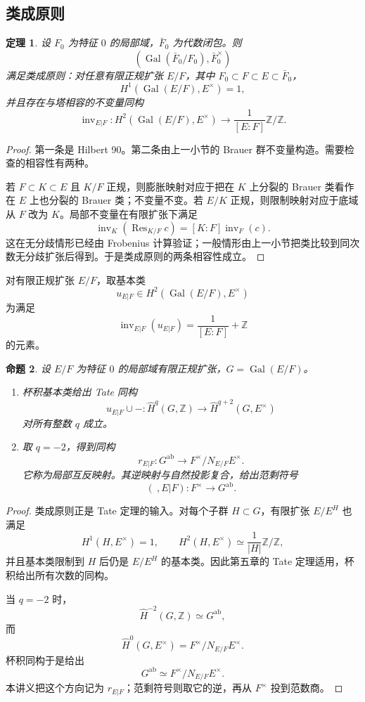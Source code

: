\documentclass[11pt,a4paper,openany]{ctexbook}
\numberwithin{equation}{chapter}
\newcommand{\Z}{\mathbb{Z}}
\newcommand{\Gal}{\operatorname{Gal}}
\theoremstyle{plain}
\newtheorem{theorem}{定理}[chapter]
\newtheorem{proposition}[theorem]{命题}
\theoremstyle{definition}
\theoremstyle{remark}
\begin{document}
\subsection{类成原则}

\begin{theorem}
设 $F_0$ 为特征 $0$ 的局部域，$\bar F_0$ 为代数闭包。则
\[
(\Gal(\bar F_0/F_0),\bar F_0^\times)
\]
满足类成原则：对任意有限正规扩张 $E/F$，其中 $F_0\subset F\subset E\subset\bar F_0$，
\[
H^1(\Gal(E/F),E^\times)=1,
\]
并且存在与塔相容的不变量同构
\[
\operatorname{inv}_{E|F}:H^2(\Gal(E/F),E^\times)\longrightarrow \frac1{[E:F]}\Z/\Z.
\]
\end{theorem}

\begin{proof}
第一条是 Hilbert 90。第二条由上一小节的 Brauer 群不变量构造。需要检查的相容性有两种。

若 $F\subset K\subset E$ 且 $K/F$ 正规，则膨胀映射对应于把在 $K$ 上分裂的 Brauer 类看作在 $E$ 上也分裂的 Brauer 类；不变量不变。若 $E/K$ 正规，则限制映射对应于底域从 $F$ 改为 $K$。局部不变量在有限扩张下满足
\[
\operatorname{inv}_K(\operatorname{Res}_{K/F}c)=[K:F]\operatorname{inv}_F(c).
\]
这在无分歧情形已经由 Frobenius 计算验证；一般情形由上一小节把类比较到同次数无分歧扩张后得到。于是类成原则的两条相容性成立。
\end{proof}

对有限正规扩张 $E/F$，取基本类
\[
u_{E|F}\in H^2(\Gal(E/F),E^\times)
\]
为满足
\[
\operatorname{inv}_{E|F}(u_{E|F})=\frac1{[E:F]}+\Z
\]
的元素。

\begin{proposition}
设 $E/F$ 为特征 $0$ 的局部域有限正规扩张，$G=\Gal(E/F)$。

\begin{enumerate}
\item 杯积基本类给出 Tate 同构
\[
u_{E|F}\cup -:\widehat H^q(G,\Z)\longrightarrow \widehat H^{q+2}(G,E^\times)
\]
对所有整数 $q$ 成立。
\item 取 $q=-2$，得到同构
\[
r_{E|F}:G^{\operatorname{ab}}\longrightarrow F^\times/N_{E/F}E^\times.
\]
它称为局部互反映射。其逆映射与自然投影复合，给出范剩符号
\[
(\ ,E|F):F^\times\longrightarrow G^{\operatorname{ab}}.
\]
\end{enumerate}
\end{proposition}

\begin{proof}
类成原则正是 Tate 定理的输入。对每个子群 $H\subset G$，有限扩张 $E/E^H$ 也满足
\[
H^1(H,E^\times)=1,\qquad H^2(H,E^\times)\simeq \frac1{|H|}\Z/\Z,
\]
并且基本类限制到 $H$ 后仍是 $E/E^H$ 的基本类。因此第五章的 Tate 定理适用，杯积给出所有次数的同构。

当 $q=-2$ 时，
\[
\widehat H^{-2}(G,\Z)\simeq G^{\operatorname{ab}},
\]
而
\[
\widehat H^0(G,E^\times)=F^\times/N_{E/F}E^\times.
\]
杯积同构于是给出
\[
G^{\operatorname{ab}}\simeq F^\times/N_{E/F}E^\times.
\]
本讲义把这个方向记为 $r_{E|F}$；范剩符号则取它的逆，再从 $F^\times$ 投到范数商。
\end{proof}
\end{document}

